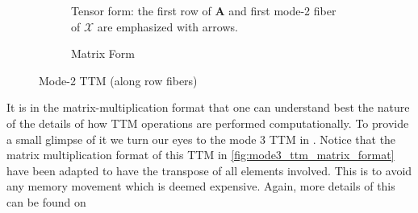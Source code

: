         \begin{figure}[ht!]
            \centering
            
            \begin{subfigure}[b]{0.99\textwidth}
                \centering
                
                \caption[Mode 2 TTM Tensor Format]{Tensor form: the first row of $\mathbf{A}$ and first mode-2 fiber of $\mathcal{X}$ are emphasized with arrows.}
                \label{fig:mode2_ttm_tensor_format}
            \end{subfigure}
            
            \vspace{1em}
            
            \begin{subfigure}[b]{0.99\textwidth}
                \centering
                
                \caption[Mode 2 TTM Tensor Format]{Matrix Form}
                \label{fig:mode2_ttm_matrix_format}
            \end{subfigure}

            \caption[Mode-2 TTM]{Mode-2 TTM (along row fibers)}
            \label{fig:Mode-2_TTM}
        \end{figure}

        It is in the matrix-multiplication format that one can understand best
        the nature of the details of how TTM operations are performed
        computationally. To provide a small glimpse of it we turn our eyes to
        the mode 3 TTM in . Notice that the matrix
        multiplication format of this TTM in \ref{fig:mode3_ttm_matrix_format}
        have been adapted to have the transpose of all elements involved. This
        is to avoid any memory movement which is deemed expensive. Again, more
        details of this can be found on \cite{Big_Boss}

